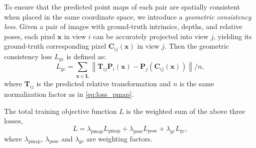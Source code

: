 To ensure that the predicted point maps of each pair are spatially consistent when placed in the same coordinate space, we introduce a \textit{geometric consistency loss}.
Given a pair of images with ground-truth intrinsics, depths, and relative poses, each pixel $\bm x$ in view $i$ can be accurately projected into view $j$, yielding its ground-truth corresponding pixel $\bm C_{ij}(\bm{x})$ in view $j$. Then the geometric consistency loss $L_\text{gc}$ is defined as:
\begin{equation}
    L_\text{gc} = \sum_{\bm x \in \bm{I}_{i}} \left\| \bm T_{ij}  \bm P_i(\bm x) - \bm P_j\left( \bm C_{ij}(\bm x) \right) \right\|/n,
\end{equation}
where $\bm T_{ij}$ is the predicted relative transformation and $n$ is the same normalization factor as in \cref{eq:loss_pmap}.

The total training objective function $L$ is the weighted sum of the above three losses,
\begin{equation}
    L = \lambda_\text{pmap}L_\text{pmap} + \lambda_\text{pose}L_\text{pose} + \lambda_\text{gc}L_\text{gc},
\end{equation}
where $\lambda_\text{pmap}$, $\lambda_\text{pose}$ and $\lambda_\text{gc}$ are weighting factors.



